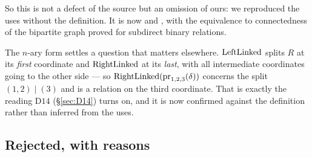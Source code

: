 So this is not a defect of the source but an omission of ours: we reproduced
the uses without the definition. It is now
 and , with the equivalence to
connectedness of the bipartite graph proved for subdirect binary relations.

The $n$-ary form settles a question that matters elsewhere. $\operatorname{LeftLinked}$
splits $R$ at its \emph{first} coordinate and $\operatorname{RightLinked}$ at its
\emph{last}, with all intermediate coordinates going to the other side --- so
$\operatorname{RightLinked}(\operatorname*{pr}_{1,2,3}(\delta))$ concerns the split $(1,2)\mid(3)$ and is
a relation on the third coordinate. That is exactly the reading $\mathrm D14$
(\S\ref{sec:D14}) turns on, and it is now confirmed against the definition
rather than inferred from the uses.

\subsection{Rejected, with reasons}\label{sec:review-rejected}

